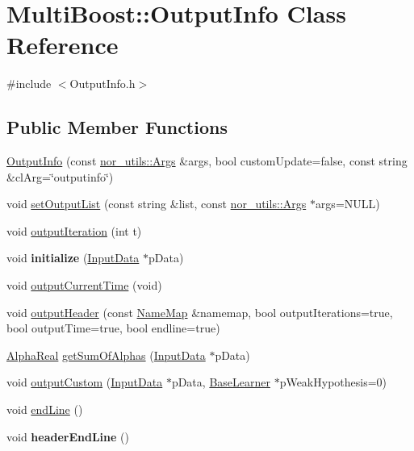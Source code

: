 \hypertarget{classMultiBoost_1_1OutputInfo}{\section{Multi\-Boost\-:\-:Output\-Info Class Reference}
\label{classMultiBoost_1_1OutputInfo}
}


{\ttfamily \#include $<$Output\-Info.\-h$>$}

\subsection*{Public Member Functions}
\begin{DoxyCompactItemize}
\item 
\hyperlink{classMultiBoost_1_1OutputInfo_a5f5b3b2096d1c332701272d2480411e1}{Output\-Info} (const \hyperlink{classnor__utils_1_1Args}{nor\-\_\-utils\-::\-Args} \&args, bool custom\-Update=false, const string \&cl\-Arg=\char`\"{}outputinfo\char`\"{})
\item 
void \hyperlink{classMultiBoost_1_1OutputInfo_a247a59efd5c6270488009f15c36c84aa}{set\-Output\-List} (const string \&list, const \hyperlink{classnor__utils_1_1Args}{nor\-\_\-utils\-::\-Args} $\ast$args=N\-U\-L\-L)
\item 
void \hyperlink{classMultiBoost_1_1OutputInfo_ac9210d45cb3c2ed39365f55bd63d1c76}{output\-Iteration} (int t)
\item 
\hypertarget{classMultiBoost_1_1OutputInfo_a165b4d7f473ab024df0d29fd5b43c730}{void {\bfseries initialize} (\hyperlink{classMultiBoost_1_1InputData}{Input\-Data} $\ast$p\-Data)}\label{classMultiBoost_1_1OutputInfo_a165b4d7f473ab024df0d29fd5b43c730}

\item 
void \hyperlink{classMultiBoost_1_1OutputInfo_a5a12b37b0fe9129ea59616829961dadf}{output\-Current\-Time} (void)
\item 
void \hyperlink{classMultiBoost_1_1OutputInfo_a563f8258a59d62a1a432d9616cb09c22}{output\-Header} (const \hyperlink{classMultiBoost_1_1NameMap}{Name\-Map} \&namemap, bool output\-Iterations=true, bool output\-Time=true, bool endline=true)
\item 
\hyperlink{Defaults_8h_a80184c4fd10ab70a1a17c5f97dcd1563}{Alpha\-Real} \hyperlink{classMultiBoost_1_1OutputInfo_a931359742e0d526a9055b47da82c438a}{get\-Sum\-Of\-Alphas} (\hyperlink{classMultiBoost_1_1InputData}{Input\-Data} $\ast$p\-Data)
\item 
void \hyperlink{classMultiBoost_1_1OutputInfo_a3e609b64c68fdf8392a969e2f6890941}{output\-Custom} (\hyperlink{classMultiBoost_1_1InputData}{Input\-Data} $\ast$p\-Data, \hyperlink{classMultiBoost_1_1BaseLearner}{Base\-Learner} $\ast$p\-Weak\-Hypothesis=0)
\item 
void \hyperlink{classMultiBoost_1_1OutputInfo_a4d9d20e123fdc12c5d4999d6ae6e444a}{end\-Line} ()
\item 
\hypertarget{classMultiBoost_1_1OutputInfo_aead6cdf710ccd7580700eb415d9475c5}{void {\bfseries header\-End\-Line} ()}\label{classMultiBoost_1_1OutputInfo_aead6cdf710ccd7580700eb415d9475c5}


\end{DoxyCompactItemize}
